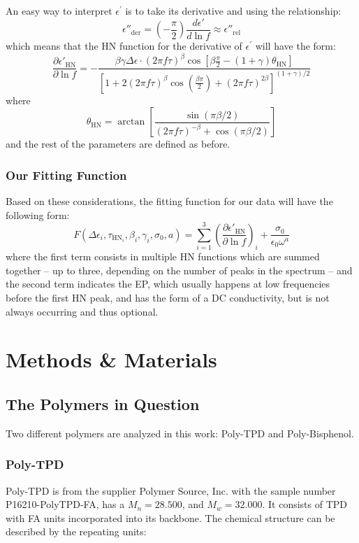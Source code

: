 An easy way to interpret $\epsilon^\prime$ is to take its derivative and using the relationship: \[
\epsilon''_{\text{der}} = \left(-\frac{\pi}{2}\right)\frac{d\epsilon'}{d\ln f} \approx \epsilon''_{\text{rel}}
\]
which means that the HN function for the derivative of $\epsilon^{\prime}$ will have the form: \[
\frac{\partial \epsilon'_{\text{HN}}}{\partial \ln f} = -\frac{\beta \gamma \Delta \epsilon \cdot (2\pi f \tau)^\beta \cos \left[\beta \frac{\pi}{2} - (1+\gamma)\theta_{\text{HN}}\right]}{\left[1 + 2(2\pi f \tau)^\beta \cos \left(\frac{\beta \pi}{2}\right) + (2\pi f \tau)^{2\beta}\right]^{(1+\gamma)/2}}
\]
where \[
\theta_{\text{HN}} = \arctan \left[\frac{\sin(\pi \beta / 2)}{(2\pi f \tau)^{-\beta} + \cos(\pi \beta / 2)}\right]
\]
and the rest of the parameters are defined as before.

\subsection{Our Fitting Function}
Based on these considerations, the fitting function for our data will have the following form: \[
F(\Delta\epsilon_i, \tau_{\text{HN}_i}, \beta_i, \gamma_i, \sigma_0, a) = \sum_{i=1}^{3} \left(\frac{\partial \epsilon'_{\text{HN}}}{\partial \ln f}\right)_i + \frac{\sigma_0}{\epsilon_0 \omega^a}
\]
where the first term consists in multiple \ac{HN} functions which are summed together -- up to three, depending on the number of peaks in the spectrum -- and the second term indicates the \ac{EP}, which usually happens at low frequencies before the first \ac{HN} peak, and has the form of a DC conductivity, but is not always occurring and thus optional.

\chapter{Methods \& Materials}
\section{The Polymers in Question}
Two different polymers are analyzed in this work: \ac{Poly-TPD} and \ac{Poly-Bisphenol}.
\subsection{Poly-TPD}
Poly-TPD is from the supplier Polymer Source, Inc.{\texttrademark}  with the sample number P16210-PolyTPD-FA, has a $M_n = 28.500$, and $M_w = 32.000$. It consists of \ac{TPD} with \ac{FA} units incorporated into its backbone. The chemical structure can be described by the repeating units:

